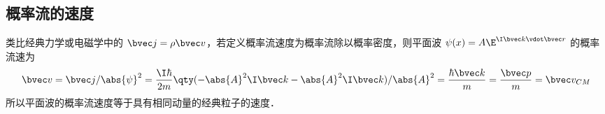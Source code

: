 \subsection{概率流的速度}

类比经典力学或电磁学中的 $\bvec j = \rho \bvec v$，若定义概率流速度为概率流除以概率密度，则平面波 $\psi (x) = A\E^{\I \bvec k \vdot \bvec r}$ 的概率流速为
\begin{equation}
\bvec v = \bvec j/\abs{\psi}^2 = \frac{\I\hbar}{2m} \qty(-\abs{A}^2 \I\bvec k - \abs{A}^2 \I\bvec k)/\abs{A}^2 = \frac{\hbar \bvec k}{m} = \frac{\bvec p}{m} = \bvec v_{CM}
\end{equation}
所以平面波的概率流速度等于具有相同动量的经典粒子的速度．
